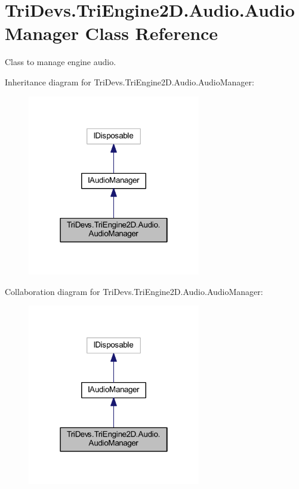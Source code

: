 \hypertarget{class_tri_devs_1_1_tri_engine2_d_1_1_audio_1_1_audio_manager}{\section{Tri\-Devs.\-Tri\-Engine2\-D.\-Audio.\-Audio\-Manager Class Reference}
\label{class_tri_devs_1_1_tri_engine2_d_1_1_audio_1_1_audio_manager}
}


Class to manage engine audio.  




Inheritance diagram for Tri\-Devs.\-Tri\-Engine2\-D.\-Audio.\-Audio\-Manager\-:\nopagebreak
\begin{figure}[H]
\begin{center}
\leavevmode
\includegraphics[width=214pt]{class_tri_devs_1_1_tri_engine2_d_1_1_audio_1_1_audio_manager__inherit__graph}
\end{center}
\end{figure}


Collaboration diagram for Tri\-Devs.\-Tri\-Engine2\-D.\-Audio.\-Audio\-Manager\-:\nopagebreak
\begin{figure}[H]
\begin{center}
\leavevmode
\includegraphics[width=214pt]{class_tri_devs_1_1_tri_engine2_d_1_1_audio_1_1_audio_manager__coll__graph}
\end{center}
\end{figure}
